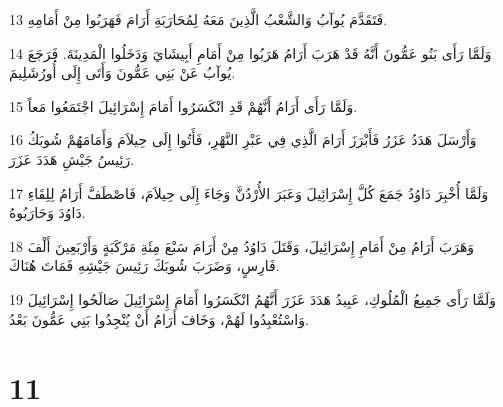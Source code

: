 \par 13 فَتَقَدَّمَ يُوآبُ وَالشَّعْبُ الَّذِينَ مَعَهُ لِمُحَارَبَةِ أَرَامَ فَهَرَبُوا مِنْ أَمَامِهِ.
\par 14 وَلَمَّا رَأَى بَنُو عَمُّونَ أَنَّهُ قَدْ هَرَبَ أَرَامُ هَرَبُوا مِنْ أَمَامِ أَبِيشَايَ وَدَخَلُوا الْمَدِينَةَ. فَرَجَعَ يُوآبُ عَنْ بَنِي عَمُّونَ وَأَتَى إِلَى أُورُشَلِيمَ.
\par 15 وَلَمَّا رَأَى أَرَامُ أَنَّهُمْ قَدِ انْكَسَرُوا أَمَامَ إِسْرَائِيلَ اجْتَمَعُوا مَعاً.
\par 16 وَأَرْسَلَ هَدَدُ عَزَرُ فَأَبْرَزَ أَرَامَ الَّذِي فِي عَبْرِ النَّهْرِ، فَأَتُوا إِلَى حِيلاَمَ وَأَمَامَهُمْ شُوبَكُ رَئِيسُ جَيْشِ هَدَدَ عَزَرَ.
\par 17 وَلَمَّا أُخْبِرَ دَاوُدُ جَمَعَ كُلَّ إِسْرَائِيلَ وَعَبَرَ الأُرْدُنَّ وَجَاءَ إِلَى حِيلاَمَ، فَاصْطَفَّ أَرَامُ لِلِقَاءِ دَاوُدَ وَحَارَبُوهُ.
\par 18 وَهَرَبَ أَرَامُ مِنْ أَمَامِ إِسْرَائِيلَ، وَقَتَلَ دَاوُدُ مِنْ أَرَامَ سَبْعَ مِئَةِ مَرْكَبَةٍ وَأَرْبَعِينَ أَلْفَ فَارِسٍ، وَضَرَبَ شُوبَكَ رَئِيسَ جَيْشِهِ فَمَاتَ هُنَاكَ.
\par 19 وَلَمَّا رَأَى جَمِيعُ الْمُلُوكِ، عَبِيدُ هَدَدَ عَزَرَ أَنَّهُمُ انْكَسَرُوا أَمَامَ إِسْرَائِيلَ صَالَحُوا إِسْرَائِيلَ وَاسْتُعْبِدُوا لَهُمْ، وَخَافَ أَرَامُ أَنْ يُنْجِدُوا بَنِي عَمُّونَ بَعْدُ.

\chapter{11}

